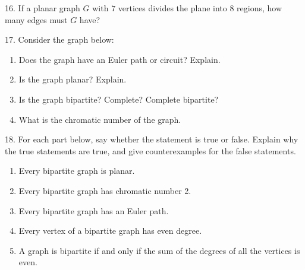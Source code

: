 \documentclass[10pt,]{book}
\theoremstyle{plain}
\theoremstyle{definition}
\numberwithin{equation}{chapter}
\newcommand{\vtx}[2]{node[fill,circle,inner sep=0pt, minimum size=4pt,label=#1:#2]{}}
\renewcommand{\v}{\vtx{above}{}}
\begin{document}
\begin{exerciselist}
\par\smallskip
\item[16.]\hypertarget{exercise-335}{}
            If a planar graph \(G\) with \(7\) vertices divides the plane into 8 regions, how many edges must \(G\) have?
\par\smallskip
\item[17.]\hypertarget{exercise-336}{}
            Consider the graph below:
          \leavevmode%
\begin{figure}
\centering
{
}
\end{figure}

          \leavevmode%
\begin{enumerate}[label=(\alph*)]
\item\hypertarget{li-846}{}
                Does the graph have an Euler path or circuit? Explain.
\item\hypertarget{li-847}{}
                Is the graph planar? Explain.
\item\hypertarget{li-848}{}
                Is the graph bipartite? Complete? Complete bipartite?
\item\hypertarget{li-849}{}
                What is the chromatic number of the graph.
\end{enumerate}

\par\smallskip
\item[18.]\hypertarget{exercise-337}{}
            For each part below, say whether the statement is true or false. Explain why the true statements are true, and give counterexamples for the false statements.
          \leavevmode%
\begin{enumerate}[label=(\alph*)]
\item\hypertarget{li-854}{}
                Every bipartite graph is planar.
\item\hypertarget{li-855}{}
                Every bipartite graph has chromatic number 2.
\item\hypertarget{li-856}{}
                Every bipartite graph has an Euler path.
\item\hypertarget{li-857}{}
                Every vertex of a bipartite graph has even degree.
\item\hypertarget{li-858}{}
                A graph is bipartite if and only if the sum of the degrees of all the vertices is even.
\end{enumerate}


\end{exerciselist}
\end{document}
